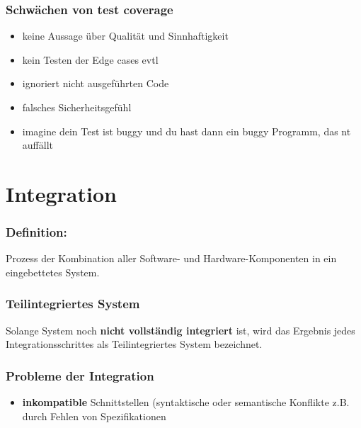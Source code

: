 \documentclass{book}
\begin{document}
    \subsection{\textbf{Schwächen von test coverage}}
    \begin{itemize}
        \item keine Aussage über Qualität und Sinnhaftigkeit
        \item kein Testen der Edge cases evtl
        \item ignoriert nicht ausgeführten Code
        \item falsches Sicherheitsgefühl
        \item imagine dein Test ist buggy und du hast dann ein buggy Programm, das nt auffällt
    \end{itemize}
    \chapter{Integration}
    \subsection{Definition:} Prozess der Kombination aller Software- und Hardware-Komponenten in ein eingebettetes System.
    \subsection{Teilintegriertes System}
    Solange System noch \textbf{nicht vollständig integriert} ist, wird das Ergebnis jedes Integrationsschrittes als Teilintegriertes System bezeichnet.

    \subsection{Probleme der Integration}
    \begin{itemize}
        \item \textbf{inkompatible} Schnittstellen (syntaktische oder semantische Konflikte z.B. durch Fehlen von Spezifikationen
    \end{itemize}
\end{document}
